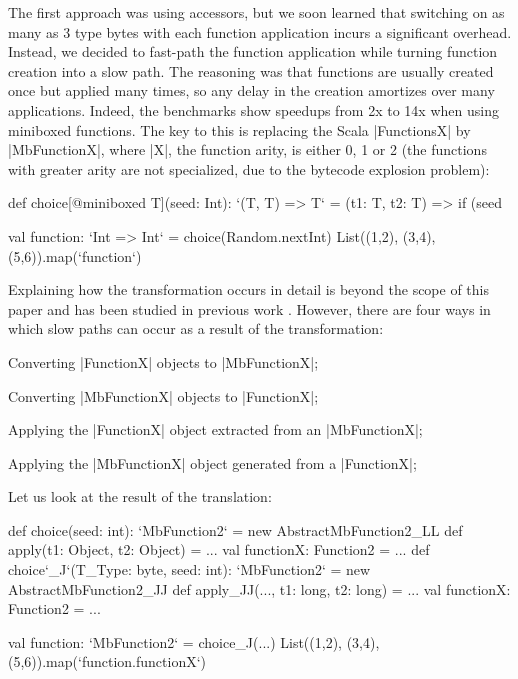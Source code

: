 The first approach was using accessors, but we soon learned that switching on as many as 3 type bytes with each function application incurs a significant overhead. Instead, we decided to fast-path the function application while turning function creation into a slow path. The reasoning was that functions are usually created once but applied many times, so any delay in the creation amortizes over many applications. Indeed, the benchmarks show speedups from 2x to 14x when using miniboxed functions. The key to this is replacing the Scala |FunctionsX| by |MbFunctionX|, where |X|, the function arity, is either 0, 1 or 2 (the functions with greater arity are not specialized, due to the bytecode explosion problem):

\begin{lstlisting-nobreak}
 def choice[@miniboxed T](seed: Int): `(T, T) => T` =
   (t1: T, t2: T) => if (seed %

 val function: `Int => Int` = choice(Random.nextInt)
 List((1,2), (3,4), (5,6)).map(`function`)
\end{lstlisting-nobreak}

Explaining how the transformation occurs in detail is beyond the scope of this paper and has been studied in previous work \cite{ldl,ildl-tech}. However, there are four ways in which slow paths can occur as a result of the transformation:
\begin{compactitem}
  \item Converting |FunctionX| objects to |MbFunctionX|;
  \item Converting |MbFunctionX| objects to |FunctionX|;
  \item Applying the |FunctionX| object extracted from an |MbFunctionX|;
  \item Applying the |MbFunctionX| object generated from a |FunctionX|;
\end{compactitem}

Let us look at the result of the translation:

\begin{lstlisting-nobreak}
 def choice(seed: int): `MbFunction2` =
   new AbstractMbFunction2_LL {
     def apply(t1: Object, t2: Object) = ...
     val functionX: Function2 = ...
   }
 def choice`_J`(T_Type: byte, seed: int): `MbFunction2` =
   new AbstractMbFunction2_JJ {
     def apply_JJ(..., t1: long, t2: long) = ...
     val functionX: Function2 = ...
   }

 val function: `MbFunction2` = choice_J(...)
 List((1,2), (3,4), (5,6)).map(`function.functionX`)
\end{lstlisting-nobreak}


